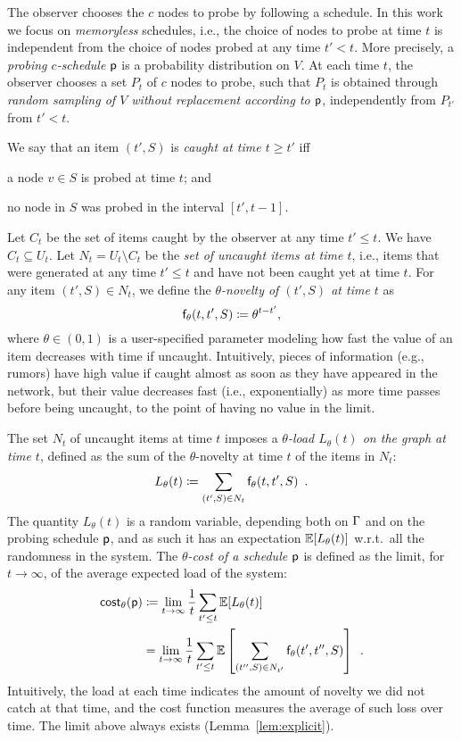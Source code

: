The observer chooses the $c$ nodes to probe by following a schedule. In this work
we focus on \emph{memoryless} schedules, i.e., the choice of nodes to probe at
time $t$ is independent from the choice of nodes probed at any time $t'<t$.
More precisely, a \emph{probing $c$-schedule} $\mathsf{p}$ is a probability
distribution on $V$. At each time $t$, the observer chooses a set $P_t$ of $c$
nodes to probe, such that $P_t$ is obtained through \emph{random sampling of $V$
without replacement according to $\mathsf{p}$}, independently from $P_{t'}$ from
$t'< t$.

We say that an item $(t',S)$ is \emph{caught at time $t\ge t'$} iff
\begin{enumerate*}
	\item a node $v\in S$ is probed at time $t$; and
	\item no node in $S$ was probed in the interval $[t',t-1]$.
\end{enumerate*}

Let $C_t$ be the set of items caught by the observer at any time $t'\le t$. We
have $C_t\subseteq U_t$. Let $N_t= U_t\setminus C_t$ be the \emph{set of
uncaught items at time $t$}, i.e., items that were generated at any time
$t'\le t$ and have not been caught yet at time $t$. For any item $(t',S)\in
N_t$, we define the \emph{$\theta$-novelty of $(t',S)$ at time $t$} as
\[
	\mathsf{f}_\theta(t,t',S)\coloneqq\theta^{t-t'},
\]
where $\theta\in(0,1)$ is a user-specified parameter modeling how fast the
value of an item decreases with time if uncaught. Intuitively, pieces of
information (e.g., rumors) have high value if caught almost as soon as they have
appeared in the network, but their value decreases fast (i.e., exponentially) as
more time passes before being uncaught, to the point of having no value in the
limit.

 The set $N_t$ of uncaught items
at time $t$ imposes a \emph{$\theta$-load $L_\theta(t)$ on the graph at time
$t$}, defined as the sum of the $\theta$-novelty at time $t$ of the items in
$N_t$:
\[
	L_\theta(t)\coloneqq\sum_{(t',S)\in N_t} \mathsf{f}_\theta(t,t',S)\enspace.
\]
The quantity $L_\theta(t)$ is a random variable, depending both on $\Gamma$ and on
the probing schedule $\mathsf{p}$, and as such it has an expectation
$\mathbb{E}[L_\theta(t)]$ w.r.t.~all the randomness in the system. The
\emph{$\theta$-cost of a schedule $\mathsf{p}$} is defined as the limit, for
$t\rightarrow\infty$, of the average expected load of the system:
\begin{align*}
	\mathsf{cost}_\theta(\mathsf{p})&\coloneqq\lim_{t\rightarrow\infty}\frac{1}{t}\sum_{t'\le
	t}\mathbb{E}[L_\theta(t)]\\
	&=\lim_{t\rightarrow\infty}\frac{1}{t}\sum_{t'\le
	t}\mathbb{E}\left[\sum_{(t'',S)\in N_{t'}}\mathsf{f}_\theta(t',t'',S)\right]\enspace.
\end{align*}
Intuitively, the load at each time indicates the amount of novelty we did not
catch at that time, and the cost function measures the average of such loss over
time. The limit above always exists (Lemma~\ref{lem:explicit}).

